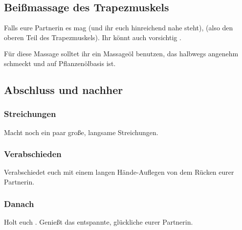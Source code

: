\subsection{Beißmassage des Trapezmuskels}

Falls eure Partnerin es mag (und ihr euch hinreichend nahe steht),  (also den oberen Teil des Trapezmuskels). Ihr könnt auch vorsichtig .

Für diese Massage solltet ihr ein Massageöl benutzen, das halbwegs angenehm schmeckt und auf Pflanzenölbasis ist.


\subsection{Abschluss und nachher}

\subsubsection{Streichungen}

Macht noch ein paar große, langsame Streichungen.

\subsubsection{Verabschieden}

Verabschiedet euch mit einem langen Hände-Auflegen von dem Rücken eurer Partnerin.

\subsubsection{Danach}
 Holt euch . Genießt das entspannte, glückliche  eurer Partnerin.
